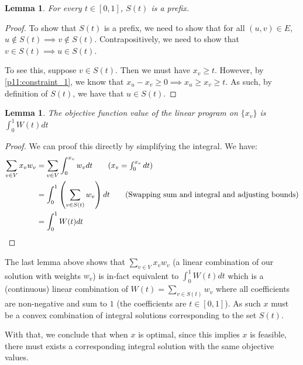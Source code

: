\documentclass[12pt]{exam}
\newtheorem{lemma}[theorem]{Lemma}
\begin{document}
\begin{questions}
\begin{solution}
\begin{enumerate}[label=(\alph*)]
    \begin{lemma}
      For every $t \in [0,1]$, $S(t)$ is a prefix.
    \end{lemma}
    \begin{proof}
      To show that $S(t)$ is a prefix, we need to show that for all $(u,v) \in E$, $u \notin S(t) \implies v \notin S(t)$. Contrapositively, we need to show that $v \in S(t) \implies u \in S(t)$. 

      To see this, suppose $v \in S(t)$. Then we must have $x_v \geq t$. However, by \ref{p11:constraint_1}, we know that $x_u - x_v \geq 0 \implies x_u \geq x_v \geq t$. As such, by definition of $S(t)$, we have that $u \in S(t)$.
    \end{proof}

    \begin{lemma}
      The objective function value of the linear program on $\{x_v\}$ is $\int_0^1 W(t) dt$
    \end{lemma}
    \begin{proof}
      We can proof this directly by simplifying the integral. We have:
      \begin{align*}
        \sum_{v \in V} x_v w_v &= \sum_{v \in V} \int_0^{x_v} w_v dt \tag{$x_v = \int_{0}^{x_v} dt$} \\
        &= \int_0^1 \left(\sum_{v \in S(t)} w_v\right) dt \tag{Swapping sum and integral and adjusting bounds} \\
        &= \int_0^1 W(t) dt
      \end{align*}
    \end{proof}


    The last lemma above shows that $\sum_{v \in V} x_v w_v$ (a linear combination of our solution with weights $w_v$) is in-fact equivalent to $\int_0^1 W(t) dt$ which is a (continuous) linear combination of $W(t) = \sum_{v \in S(t)} w_v$ where all coefficients are non-negative and sum to $1$ (the coefficients are $t \in [0,1]$). As such $x$ must be a convex combination of integral solutions corresponding to the set $S(t)$.

    With that, we conclude that when $x$ is optimal, since this implies $x$ is feasible, there must exists a corresponding integral solution with the same objective values.


\end{enumerate}
\end{solution}
\end{questions}
\end{document}
